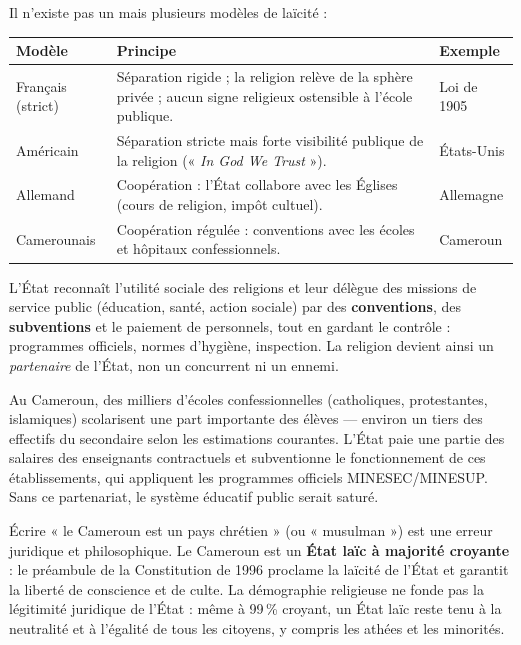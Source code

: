 \documentclass[11pt]{article}
\begin{document}
Il n'existe pas un mais plusieurs modèles de laïcité :

\begin{center}
\begin{tabularx}{\linewidth}{|l|X|X|}\hline
\rowcolor{popblueL} \textbf{Modèle} & \textbf{Principe} & \textbf{Exemple} \\ \hline
Français (strict) & Séparation rigide ; la religion relève de la sphère privée ; aucun signe religieux ostensible à l'école publique. & Loi de 1905 \\ \hline
Américain & Séparation stricte mais forte visibilité publique de la religion (« \emph{In God We Trust} »). & États-Unis \\ \hline
Allemand & Coopération : l'État collabore avec les Églises (cours de religion, impôt cultuel). & Allemagne \\ \hline
Camerounais & Coopération régulée : conventions avec les écoles et hôpitaux confessionnels. & Cameroun \\ \hline
\end{tabularx}
\end{center}

\begin{definition}
L'État reconnaît l'utilité sociale des religions et leur délègue des missions de service public (éducation, santé, action sociale) par des \textbf{conventions}, des \textbf{subventions} et le paiement de personnels, tout en gardant le contrôle : programmes officiels, normes d'hygiène, inspection. La religion devient ainsi un \emph{partenaire} de l'État, non un concurrent ni un ennemi.
\end{definition}

\begin{exemplebox}
Au Cameroun, des milliers d'écoles confessionnelles (catholiques, protestantes, islamiques) scolarisent une part importante des élèves — environ un tiers des effectifs du secondaire selon les estimations courantes. L'État paie une partie des salaires des enseignants contractuels et subventionne le fonctionnement de ces établissements, qui appliquent les programmes officiels MINESEC/MINESUP. Sans ce partenariat, le système éducatif public serait saturé.
\end{exemplebox}

\begin{attention}
Écrire « le Cameroun est un pays chrétien » (ou « musulman ») est une erreur juridique et philosophique. Le Cameroun est un \textbf{État laïc à majorité croyante} : le préambule de la Constitution de 1996 proclame la laïcité de l'État et garantit la liberté de conscience et de culte. La démographie religieuse ne fonde pas la légitimité juridique de l'État : même à 99\,\% croyant, un État laïc reste tenu à la neutralité et à l'égalité de tous les citoyens, y compris les athées et les minorités.
\end{attention}
\end{document}
